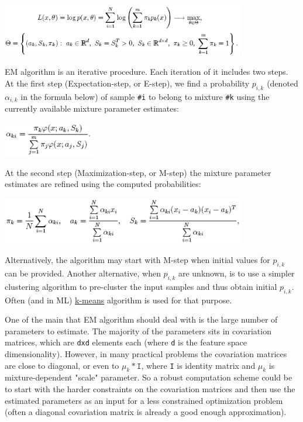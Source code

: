 \includegraphics[width=0.8\textwidth]{pics/em3.png}

EM algorithm is an iterative procedure. Each iteration of it includes two steps. At the first step (Expectation-step, or E-step), we find a probability $p_{i,k}$ (denoted $\alpha_{i,k}$ in the formula below) of sample \texttt{\#i} to belong to mixture \texttt{\#k} using the currently available mixture parameter estimates:

\includegraphics[width=0.3\textwidth]{pics/em4.png}

At the second step (Maximization-step, or M-step) the mixture parameter estimates are refined using the computed probabilities:

\includegraphics[width=0.8\textwidth]{pics/em5.png}

Alternatively, the algorithm may start with M-step when initial values for $p_{i,k}$ can be provided. Another alternative, when $p_{i,k}$ are unknown, is to use a simpler clustering algorithm to pre-cluster the input samples and thus obtain initial $p_{i,k}$. Often (and in ML) \href{CxCore#KMeans2}{k-means} algorithm is used for that purpose.

One of the main that EM algorithm should deal with is the large number of parameters to estimate. The majority of the parameters sits in covariation matrices, which are \texttt{dxd} elements each (where \texttt{d} is the feature space dimensionality). However, in many practical problems the covariation matrices are close to diagonal, or even to $\mu_k*\texttt{I}$, where \texttt{I} is identity matrix and $\mu_k$ is mixture-dependent "scale" parameter. So a robust computation scheme could be to start with the harder constraints on the covariation matrices and then use the estimated parameters as an input for a less constrained optimization problem (often a diagonal covariation matrix is already a good enough approximation).

